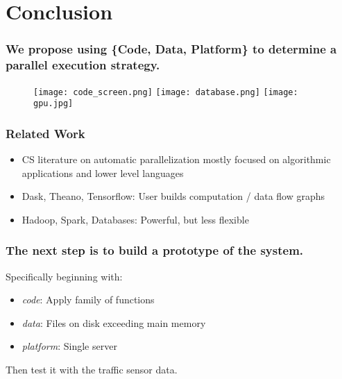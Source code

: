 \documentclass{beamer}
\begin{document}
\begin{frame}[fragile]
\end{frame}
\section{Conclusion}
\begin{frame}

    \frametitle{We propose using \{Code, Data, Platform\} to determine a
    parallel execution strategy.}

\begin{figure}
            \texttt{[image: code\_screen.png]}
            \hfill
            \texttt{[image: database.png]}
            \hfill
            \texttt{[image: gpu.jpg]}
\end{figure}

\end{frame}
\begin{frame}

    \frametitle{Related Work}


\begin{itemize}
    \item CS literature on automatic parallelization mostly focused on algorithmic applications
        and lower level languages
    \item Dask, Theano, Tensorflow: User builds computation / data flow graphs
    \item Hadoop, Spark, Databases: Powerful, but less flexible
\end{itemize}

\end{frame}
\begin{frame}

    \frametitle{The next step is to build a prototype of the system.}

    Specifically beginning with:

\begin{itemize}
    \item \emph{code}: Apply family of functions
    \item \emph{data}: Files on disk exceeding main memory
    \item \emph{platform}: Single server
\end{itemize}

Then test it with the traffic sensor data.

\end{frame}
\end{document}
